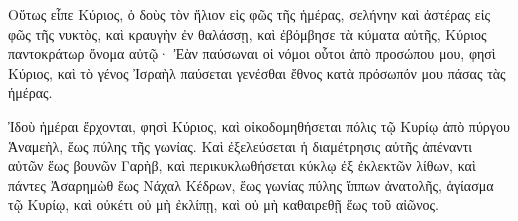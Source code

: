 {\par }{\PP {}Οὕτως εἶπε Κύριος, ὁ δοὺς τὸν ἥλιον εἱς φῶς τῆς ἡμέρας, σελήνην καὶ ἀστέρας εἰς φῶς τῆς νυκτὸς, καὶ κραυγὴν ἐν θαλάσσῃ, καὶ ἐβόμβησε τὰ κύματα αὐτῆς, Κύριος παντοκράτωρ ὄνομα αὐτῷ·
Ἐὰν παύσωναι οἱ νόμοι οὗτοι ἀπὸ προσώπου μου, φησὶ Κύριος, καὶ τὸ γένος Ἰσραὴλ παύσεται γενέσθαι ἔθνος κατὰ πρόσωπόν μου πάσας τὰς ἡμέρας.
\par }{\PP {}Ἰδοὺ ἡμέραι ἔρχονται, φησὶ Κύριος, καὶ οἰκοδομηθήσεται πόλις τῷ Κυρίῳ ἀπὸ πύργου Ἁναμεὴλ, ἕως πύλης τῆς γωνίας.
Καὶ ἐξελεύσεται ἡ διαμέτρησις αὐτῆς ἀπέναντι αὐτῶν ἕως βουνῶν Γαρὴβ, καὶ περικυκλωθήσεται κύκλῳ ἐξ ἐκλεκτῶν λίθων,
καὶ πάντες Ἀσαρημὼθ ἕως Νάχαλ Κέδρων, ἕως γωνίας πύλης ἵππων ἀνατολῆς, ἁγίασμα τῷ Κυρίῳ, καὶ οὐκέτι οὐ μὴ ἐκλίπῃ, καὶ οὐ μὴ καθαιρεθῇ ἕως τοῦ αἰῶνος.

}
